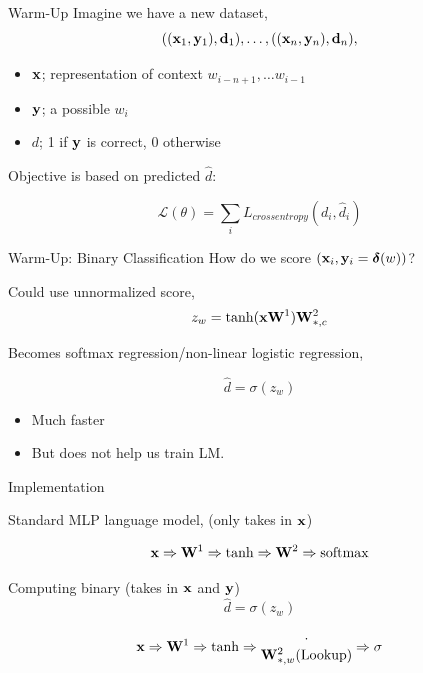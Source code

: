 \documentclass{beamer}
\begin{document}
\begin{frame}{Warm-Up}
 Imagine we have a new dataset, 
  \[ ((\mathbf{x}_1, \mathbf{y}_1), \mathbf{d}_1),\ldots, ((\mathbf{x}_n, \mathbf{y}_n), \mathbf{d}_n), \]
 
  \begin{itemize}
  \item $\mathbf{x}$; representation of context  $w_{i-n+1}, \ldots w_{i-1}$ 
  \item $\mathbf{y}$; a possible $w_i$
  \item $d$; 1 if $\mathbf{y}$ is correct, 0 otherwise
  \end{itemize}
  
  Objective is based on predicted $\hat{d}$:

  \[ \mathcal{L}(\theta) = \sum_{i} L_{crossentropy}(d_i, \hat{d}_i) \] 
\end{frame}


\begin{frame}{Warm-Up: Binary Classification}
  How do we score $(\mathbf{x}_i, \mathbf{y}_i = \boldsymbol{\delta}(w))$? 
\air 

Could use unnormalized score,
  \[ z_w = \tanh(\mathbf{x} \mathbf{W}^1)\mathbf{W}^2_{*,c}  \] 


  Becomes softmax regression/non-linear logistic regression,

  \[\hat{d} = \sigma(z_w)\]

  \begin{itemize}
  \item Much faster
  \item  But does not help us train LM.
  \end{itemize}

\end{frame}


\begin{frame}{Implementation}
  
  Standard MLP language model, (only takes in $\mathbf{x}$) 

  \[\boldx \Rightarrow \boldW^1 \Rightarrow \tanh \Rightarrow  \boldW^2 \Rightarrow \softmax\]



  Computing binary  (takes in $\mathbf{x}$ and $\mathbf{y}$) 
  \[\hat{d} = \sigma(z_w)\]

 \[\mathbf{x} \Rightarrow \mathbf{W}^1 \Rightarrow \tanh \Rightarrow
 \begin{matrix}
   \cdot \\ 
   \mathbf{W}^2_{*, w} \mathrm{(Lookup)}
 \end{matrix}
\Rightarrow \sigma\]
\end{frame}
\end{document}
